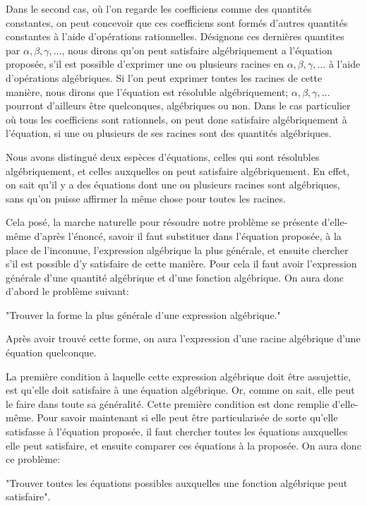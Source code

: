 \documentclass{article}
\begin{document}
Dans le second cas, où l'on regarde les coefficiens comme des quantités constantes, on peut concevoir que ces coefficiens sont formés d'autres quantités constantes à l'aide d'opérations rationnelles. Désignons ces dernières quantites par \(\alpha, \beta, \gamma, \ldots\), nous dirons qu'on peut satisfaire algébriquement a l'équation proposée, s'il est possible d'exprimer une ou plusieurs racines en \(\alpha, \beta, \gamma, \ldots\) à l'aide d'opérations algébriques. Si l'on peut exprimer tontes les racines de cette manière, nous dirons que l'équation est résoluble algébriquement; \(\alpha, \beta, \gamma, \ldots\) pourront d'ailleurs être quelconques, algébriques ou non. Dans le cas particulier où tous les coefficiens sont rationnels, on peut done satisfaire algébriquement à l'équation, si une ou plusieurs de ses racines sont des quantités algébriques.

Nous avons distingué deux espèces d'équations, celles qui sont résolubles algébriquement, et celles auxquelles on peut satisfaire algébriquement. En effet, on sait qu'il y a des équations dont une ou plusieurs racines sont algébriques, sans qu'on puisse affirmer la même chose pour toutes les racines.

Cela posé, la marche naturelle pour résoudre notre problème se présente d'elle-même d'après l'énoncé, savoir il faut substituer dans l'équation proposée, à la place de l'inconuue, l'expression algébrique la plus générale, et ensuite chercher s'il est possible d'y satisfaire de cette manière. Pour cela il faut avoir l'expression générale d'une quantité algébrique et d'une fonction algébrique. On aura donc d'abord le problème suivant:

"Trouver la forme la plus générale d'une expression algébrique."

Après avoir trouvé cette forme, on aura l'expression d'une racine algébrique d'une équation quelconque.

La première condition à laquelle cette expression algébrique doit être assujettie, est qu'elle doit satisfaire à une équation algébrique. Or, comme on sait, elle peut le faire dans toute sa généralité. Cette première condition est donc remplie d'elle-même. Pour savoir maintenant si elle peut être particularisée de sorte qu'elle satisfasse à l'équation proposée, il faut chercher toutes les équations auxquelles elle peut satisfaire, et ensuite comparer ces équations à la proposée. On aura donc ce problème:

"Trouver toutes les équations possibles auxquelles une fonction algébrique peut satisfaire".
\end{document}
